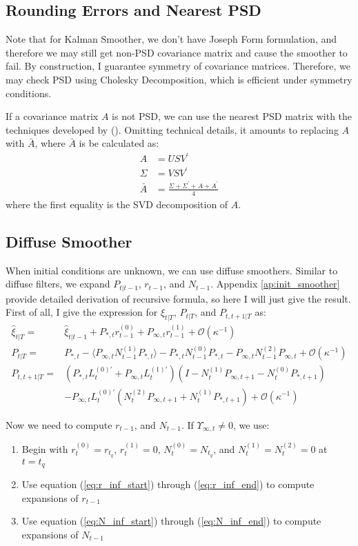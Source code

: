 \documentclass[10pt]{article}
\newenvironment{boenumerate}
    {\begin{enumerate}\renewcommand\labelenumi{\textbf\theenumi}}
    {\end{enumerate}}
\numberwithin{equation}{section}
\begin{document}
\subsection{Rounding Errors and Nearest PSD}
Note that for Kalman Smoother, we don't have Joseph Form formulation, and therefore we may still get non-PSD covariance matrix and cause the smoother to fail. By construction, I guarantee symmetry of covariance matrices. Therefore, we may check PSD using Cholesky Decomposition, which is efficient under symmetry conditions.

If a covariance matrix $A$ is not PSD, we can use the nearest PSD matrix with the techniques developed by (\cite{higham_1988}). Omitting technical details, it amounts to replacing $A$ with $\bar{A}$, where $\bar{A}$ is be calculated as:
\begin{align*}
    A &= USV^{'} \\
    \Sigma &= VSV^{'} \\
    \bar{A} &= \frac{\Sigma + \Sigma^{'} + A + A^{'}}{4}
\end{align*}
where the first equality is the SVD decomposition of $A$.

\subsection{Diffuse Smoother}
When initial conditions are unknown, we can use diffuse smoothers. Similar to diffuse filters, we expand $P_{t|t-1}$, $r_{t-1}$, and $N_{t-1}$. Appendix \ref{ap:init_smoother} provide detailed derivation of recursive formula, so here I will just give the result. First of all, I give the expression for $\hat{\xi}_{t|T}$, $P_{t|T}$, and $P_{t,t+1|T}$ as:
\begin{align}
    \hat{\xi}_{t|T} =& \hat{\xi}_{t|t-1} + P_{*,t}r_{t-1}^{(0)}+P_{\infty,t}r_{t-1}^{(1)}+\mathcal{O}(\kappa^{-1}) \label{eq:diff_xi} \\
    P_{t|T} =& P_{*,t} - \langle P_{\infty,t}N_{t-1}^{(1)}P_{*,t}\rangle - P_{*,t}N_{t-1}^{(0)}P_{*,t} 
        - P_{\infty,t}N_{t-1}^{(2)}P_{\infty,t} + \mathcal{O}(\kappa^{-1}) \label{eq:diff_P} \\
    P_{t,t+1|T} =& (P_{*,t}L_t^{(0)'}+P_{\infty,t}L_t^{(1)'})(I-N_t^{(1)}P_{\infty,t+1}-N_t^{(0)}P_{*,t+1}) \nonumber \\
    &- P_{\infty,t}L_t^{(0)'}(N_t^{(2)}P_{\infty,t+1}+N_t^{(1)}P_{*,t+1}) + \mathcal{O}(\kappa^{-1}) \label{eq:diff_Pcov}
\end{align}

Now we need to compute $r_{t-1}$, and $N_{t-1}$. If $\Upsilon_{\infty,t}\neq 0$, we use:
\begin{boenumerate}
    \item Begin with $r_{t}^{(0)}=r_{t_q}$, $r_t^{(1)}=0$, $N_t^{(0)}=N_{t_q}$, and $N_t^{(1)}=N_{t}^{(2)}=0$ at $t=t_q$
    \item Use equation (\ref{eq:r_inf_start}) through (\ref{eq:r_inf_end}) to compute expansions of $r_{t-1}$
    \item Use equation (\ref{eq:N_inf_start}) through (\ref{eq:N_inf_end}) to compute expansions of $N_{t-1}$
\end{boenumerate}
\end{document}
